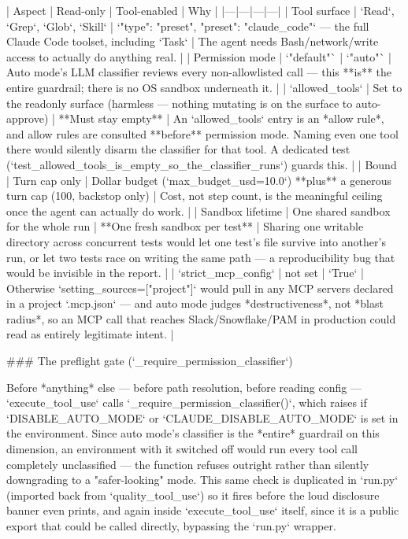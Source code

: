 | Aspect | Read-only | Tool-enabled | Why |
|---|---|---|---|
| Tool surface | `Read`, `Grep`, `Glob`, `Skill` | `{"type": "preset", "preset": "claude_code"}` — the full Claude Code toolset, including `Task` | The agent needs Bash/network/write access to actually do anything real. |
| Permission mode | `"default"` | `"auto"` | Auto mode's LLM classifier reviews every non-allowlisted call — this **is** the entire guardrail; there is no OS sandbox underneath it. |
| `allowed_tools` | Set to the readonly surface (harmless — nothing mutating is on the surface to auto-approve) | **Must stay empty** | An `allowed_tools` entry is an *allow rule*, and allow rules are consulted **before** permission mode. Naming even one tool there would silently disarm the classifier for that tool. A dedicated test (`test_allowed_tools_is_empty_so_the_classifier_runs`) guards this. |
| Bound | Turn cap only | Dollar budget (`max_budget_usd=10.0`) **plus** a generous turn cap (100, backstop only) | Cost, not step count, is the meaningful ceiling once the agent can actually do work. |
| Sandbox lifetime | One shared sandbox for the whole run | **One fresh sandbox per test** | Sharing one writable directory across concurrent tests would let one test's file survive into another's run, or let two tests race on writing the same path — a reproducibility bug that would be invisible in the report. |
| `strict_mcp_config` | not set | `True` | Otherwise `setting_sources=["project"]` would pull in any MCP servers declared in a project `.mcp.json` — and auto mode judges *destructiveness*, not *blast radius*, so an MCP call that reaches Slack/Snowflake/PAM in production could read as entirely legitimate intent. |

### The preflight gate (`_require_permission_classifier`)

Before *anything* else — before path resolution, before reading config — `execute_tool_use` calls `_require_permission_classifier()`, which raises if `DISABLE_AUTO_MODE` or `CLAUDE_DISABLE_AUTO_MODE` is set in the environment. Since auto mode's classifier is the *entire* guardrail on this dimension, an environment with it switched off would run every tool call completely unclassified — the function refuses outright rather than silently downgrading to a "safer-looking" mode. This same check is duplicated in `run.py` (imported back from `quality_tool_use`) so it fires before the loud disclosure banner even prints, and again inside `execute_tool_use` itself, since it is a public export that could be called directly, bypassing the `run.py` wrapper.

